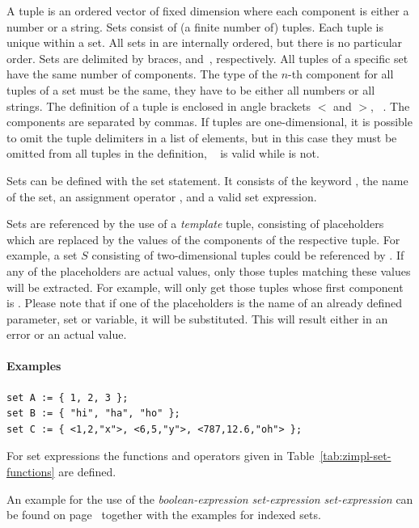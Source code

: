 A tuple is an ordered vector of fixed dimension where each component
is either a number or a string. Sets consist of (a finite number of)
tuples. Each tuple is unique within a set. All sets in \zimpl are
internally ordered, but there is no particular order.  Sets are
delimited by braces, \code{\{} and~\code{\}}, respectively.  All
tuples of a specific set have the same number of components.  The type
of the $n$-th component for all tuples of a set must be the same, \ie
they have to be either all numbers or all strings.  The definition of
a tuple is enclosed in angle brackets $<$ and $>$,
\eg\ . The components are separated by commas.  If
tuples are one-dimensional, it is possible to omit the tuple
delimiters in a list of elements, but in this case they must be
omitted from all tuples in the definition, \eg\  is
valid while  is not.

Sets can be defined with the set statement. It consists of
the keyword , the name of the set, an assignment operator
\code{:=}, and a valid set expression.

Sets are referenced by the use of a \emph{template} tuple, consisting
of placeholders which are replaced by the values of the components of
the respective tuple. For example, a set $S$ consisting of two-dimensional
tuples could be referenced by . If any of the
placeholders are actual values, only those tuples matching these
values will be extracted.
For example,  will only get
those tuples whose first component is . Please note that if
one of the placeholders is the name of an already defined parameter,
set or variable, it will be substituted. This will result either in an
error or an actual value.

\paragraph{Examples}
{\small
\begin{verbatim}
set A := { 1, 2, 3 };
set B := { "hi", "ha", "ho" };
set C := { <1,2,"x">, <6,5,"y">, <787,12.6,"oh"> };
\end{verbatim}
}
\noindent For set expressions the functions and
operators given in Table~\ref{tab:zimpl-set-functions} are defined.

An example for the use of the  \emph{boolean-expression} 
\emph{set-expression}  \emph{set-expression}  can
be found on page~\pageref{sec:indexed-sets} together with the examples for indexed sets.

